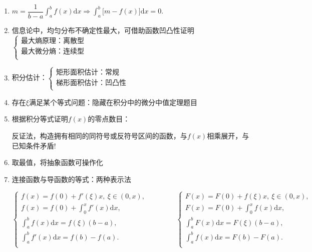 \documentclass[UTF8]{ctexart}
\numberwithin{equation}{section}
\numberwithin{figure}{section}
\numberwithin{table}{section}
\newcommand\dif{\mathrm{d}}
\newcommand\dis{\displaystyle}
\newcommand\intd{\dis\int}
\newcommand\intab{\dis\int_a^b}
\begin{document}
\begin{spacing}{2}
\begin{enumerate}[itemindent=1.4em, label=(\arabic*)]

\item $m=\dfrac{1}{b-a}\intab f(x)\dif x\Longrightarrow
\intab\big[m-f(x)\big]\dif x=0.$

\item 信息论中，均匀分布不确定性最大，可借助函数凹凸性证明
$\left\{\begin{array}{l}
\text{最大熵原理：离散型}\\
\text{最大微分熵：连续型}\\
\end{array}\right.$

\item 积分估计：$\left\{\begin{array}{l}
\text{矩形面积估计：常规}\\
\text{梯形面积估计：凹凸性}\\
\end{array}\right.$

\vspace{0.3cm}

\item 存在$\xi$满足某个等式问题：隐藏在积分中的微分中值定理题目

\item 根据积分等式证明$f(x)$的零点数目：

反证法，构造拥有相同的同符号或反符号区间的函数，与$f(x)$相乘展开，与已知条件矛盾!

\item 取最值，将抽象函数可操作化

\item 连接函数与导函数的等式：两种表示法

$\left\{\begin{array}{l}
f(x)=f(0)+f'(\xi)x,\ \xi\in(0,x),\\
f(x)=f(0)+\intd_0^xf'(x)\dif x,\\
\intab f(x)\dif x=f(\xi)(b-a),\\
\intab f'(x)\dif x=f(b)-f(a).\\
\end{array}\right.
\qquad\qquad
\left\{\begin{array}{l}
F(x)=F(0)+f(\xi)x,\ \xi\in(0,x),\\
F(x)=F(0)+\intd_0^xf(x)\dif x,\\
\intab F(x)\dif x=F(\xi)(b-a),\\
\intab f(x)\dif x=F(b)-F(a).\\
\end{array}\right.$


\end{enumerate}
\end{spacing}
\end{document}

